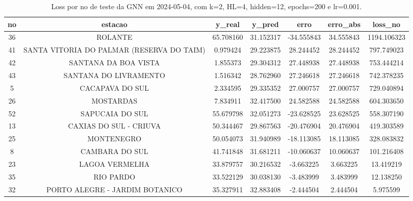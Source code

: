 \begin{table}[h]
\centering
\caption{Loss por no de teste da GNN em 2024-05-04, com k=2, HL=4, hidden=12, epochs=200 e lr=0.001.}
\label{tab:gnn_loss_k2_hl4_h12_e200_d20240504}
\begin{tabular}{ccccccc}
\toprule
no & estacao & y\_real & y\_pred & erro & erro\_abs & loss\_no \\
\midrule
36 & ROLANTE & 65.708160 & 31.152317 & -34.555843 & 34.555843 & 1194.106323 \\
41 & SANTA VITORIA DO PALMAR (RESERVA DO TAIM) & 0.979424 & 29.223875 & 28.244452 & 28.244452 & 797.749023 \\
42 & SANTANA DA BOA VISTA & 1.855373 & 29.304312 & 27.448938 & 27.448938 & 753.444214 \\
43 & SANTANA DO LIVRAMENTO & 1.516342 & 28.762960 & 27.246618 & 27.246618 & 742.378235 \\
5 & CACAPAVA DO SUL & 2.334595 & 29.335352 & 27.000757 & 27.000757 & 729.040894 \\
26 & MOSTARDAS & 7.834911 & 32.417500 & 24.582588 & 24.582588 & 604.303650 \\
52 & SAPUCAIA DO SUL & 55.679798 & 32.051273 & -23.628525 & 23.628525 & 558.307190 \\
13 & CAXIAS DO SUL - CRIUVA & 50.344467 & 29.867563 & -20.476904 & 20.476904 & 419.303589 \\
25 & MONTENEGRO & 50.054073 & 31.940989 & -18.113085 & 18.113085 & 328.083832 \\
8 & CAMBARA DO SUL & 41.741848 & 31.681211 & -10.060637 & 10.060637 & 101.216408 \\
23 & LAGOA VERMELHA & 33.879757 & 30.216532 & -3.663225 & 3.663225 & 13.419219 \\
35 & RIO PARDO & 33.522129 & 30.038130 & -3.483999 & 3.483999 & 12.138250 \\
32 & PORTO ALEGRE - JARDIM BOTANICO & 35.327911 & 32.883408 & -2.444504 & 2.444504 & 5.975599 \\
\bottomrule
\end{tabular}
\end{table}
